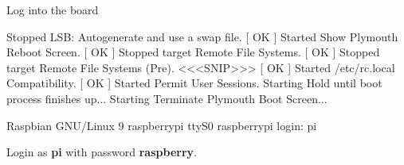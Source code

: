 \begin{frame}
   {Log into the board}
   \begin{raw}
[  OK  ] Stopped LSB: Autogenerate and use a swap file.
[  OK  ] Started Show Plymouth Reboot Screen.
[  OK  ] Stopped target Remote File Systems.
[  OK  ] Stopped target Remote File Systems (Pre).
<<<SNIP>>>
[  OK  ] Started /etc/rc.local Compatibility.
[  OK  ] Started Permit User Sessions.
         Starting Hold until boot process finishes up...
         Starting Terminate Plymouth Boot Screen...

Raspbian GNU/Linux 9 raspberrypi ttyS0
raspberrypi login: pi
   \end{raw}

   Login as \textbf{pi} with password \textbf{raspberry}.
\end{frame}

\cprotect\note{


}

